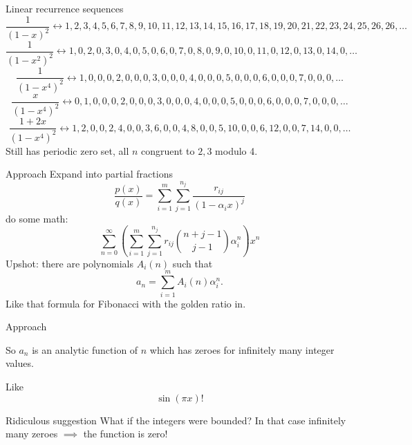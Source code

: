 \documentclass[notheorems]{beamer}
\theoremstyle{plain}
\begin{document}
\begin{frame}{Linear recurrence sequences}
\begin{equation*}
	\frac{1}{(1-x)^2} \leftrightarrow 1,2,3,4,5,6,7,8,9,10,11,12,13,14,15,16,17,18,19,20,21,22,23,24,25,26,26,\ldots
\end{equation*}
\begin{equation*}
	\frac{1}{(1-x^2)^2} \leftrightarrow 1,0,2,0,3,0,4,0,5,0,6,0,7,0,8,0,9,0,10,0,11,0,12,0,13,0,14,0,\ldots
\end{equation*}
\begin{equation*}
\frac{1}{(1-x^4)^2} \leftrightarrow 1,0,0,0,2,0,0,0,3,0,0,0,4,0,0,0,5,0,0,0,6,0,0,0,7,0,0,0,\ldots
\end{equation*}
\pause
%
\begin{equation*}
\frac{x}{(1-x^4)^2} \leftrightarrow 0,1,0,0,0,2,0,0,0,3,0,0,0,4,0,0,0,5,0,0,0,6,0,0,0,7,0,0,0,\ldots
\end{equation*}
\pause
%
\begin{equation*}
\frac{1+2x}{(1-x^4)^2} \leftrightarrow 1,2,0,0,2,4,0,0,3,6,0,0,4,8,0,0,5,10,0,0,6,12,0,0,7,14,0,0,\ldots
\end{equation*}
\pause
Still has periodic zero set, all \(n\) congruent to \(2,3\) modulo 4.%
\par
\end{frame}

\begin{frame}{Approach}
Expand into partial fractions%
\begin{equation*}
\frac{p(x)}{q(x)} = \sum_{i = 1}^m \sum_{j=1}^{n_j} \frac{r_{ij}}{(1-\alpha_i x)^j}
\end{equation*}
\pause
do some math:
\begin{equation*}
\sum_{n=0}^\infty \left(\sum_{i = 1}^m \sum_{j=1}^{n_j} r_{ij} \binom{n+j-1}{j-1}  \alpha_i^n\right) x^n
\end{equation*}
\pause
Upshot: there are polynomials \(A_i(n)\) such that%
\begin{equation*}
a_n = \sum_{i=1}^m A_i(n)\alpha_i^n\text{.}
\end{equation*}
Like that formula for Fibonacci with the golden ratio in.
\end{frame}

\begin{frame}{Approach}

So \(a_n\) is an analytic function of \(n\) which has zeroes for infinitely many integer values.
\par\pause
Like \[\sin(\pi x)!\]
\par\pause
\begin{alertblock}{Ridiculous suggestion}
What if the integers were bounded? In that case infinitely many zeroes \(\implies\) the function is zero!
\end{alertblock}
\end{frame}
\end{document}
